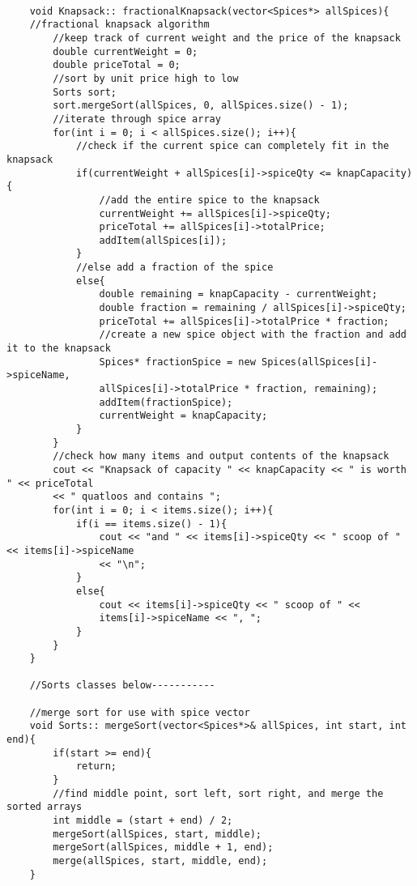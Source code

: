 \documentclass[letterpaper, 10pt,DIV=13]{scrartcl}
\numberwithin{equation}{section} %
\numberwithin{figure}{section} %
\numberwithin{table}{section} %
\begin{document}
\begin{lstlisting}[frame=single, ]
    
    void Knapsack:: fractionalKnapsack(vector<Spices*> allSpices){ 
    //fractional knapsack algorithm
        //keep track of current weight and the price of the knapsack
        double currentWeight = 0;
        double priceTotal = 0;
        //sort by unit price high to low
        Sorts sort;
        sort.mergeSort(allSpices, 0, allSpices.size() - 1);
        //iterate through spice array
        for(int i = 0; i < allSpices.size(); i++){
            //check if the current spice can completely fit in the knapsack
            if(currentWeight + allSpices[i]->spiceQty <= knapCapacity){
                //add the entire spice to the knapsack
                currentWeight += allSpices[i]->spiceQty;
                priceTotal += allSpices[i]->totalPrice;
                addItem(allSpices[i]);
            }
            //else add a fraction of the spice
            else{
                double remaining = knapCapacity - currentWeight;
                double fraction = remaining / allSpices[i]->spiceQty;
                priceTotal += allSpices[i]->totalPrice * fraction;
                //create a new spice object with the fraction and add it to the knapsack
                Spices* fractionSpice = new Spices(allSpices[i]->spiceName, 
                allSpices[i]->totalPrice * fraction, remaining);
                addItem(fractionSpice);
                currentWeight = knapCapacity;
            }
        }
        //check how many items and output contents of the knapsack
        cout << "Knapsack of capacity " << knapCapacity << " is worth " << priceTotal 
        << " quatloos and contains ";
        for(int i = 0; i < items.size(); i++){
            if(i == items.size() - 1){
                cout << "and " << items[i]->spiceQty << " scoop of " << items[i]->spiceName 
                << "\n";
            }
            else{
                cout << items[i]->spiceQty << " scoop of " << 
                items[i]->spiceName << ", ";
            }
        }
    }
    
    //Sorts classes below-----------
    
    //merge sort for use with spice vector
    void Sorts:: mergeSort(vector<Spices*>& allSpices, int start, int end){
        if(start >= end){
            return;
        }
        //find middle point, sort left, sort right, and merge the sorted arrays
        int middle = (start + end) / 2;
        mergeSort(allSpices, start, middle);
        mergeSort(allSpices, middle + 1, end);
        merge(allSpices, start, middle, end);
    }
    

\end{lstlisting}
\end{document}
